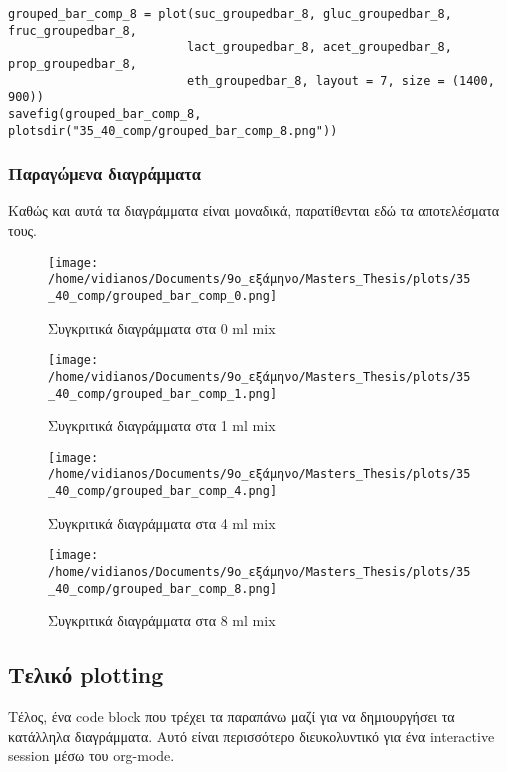 \documentclass[11pt]{article}
\begin{document}
\begin{verbatim}
grouped_bar_comp_8 = plot(suc_groupedbar_8, gluc_groupedbar_8, fruc_groupedbar_8,
                         lact_groupedbar_8, acet_groupedbar_8, prop_groupedbar_8,
                         eth_groupedbar_8, layout = 7, size = (1400, 900))
savefig(grouped_bar_comp_8, plotsdir("35_40_comp/grouped_bar_comp_8.png"))

\end{verbatim}

\subsubsection{Παραγώμενα διαγράμματα}
\label{sec:orgd11bb2e}
Καθώς και αυτά τα διαγράμματα είναι μοναδικά, παρατίθενται εδώ τα αποτελέσματα τους.

\begin{figure}[htbp]
\centering
\texttt{[image: /home/vidianos/Documents/9o\_εξάμηνο/Masters\_Thesis/plots/35\_40\_comp/grouped\_bar\_comp\_0.png]}
\caption{Συγκριτικά διαγράμματα στα 0 ml mix}
\end{figure}

\begin{figure}[htbp]
\centering
\texttt{[image: /home/vidianos/Documents/9o\_εξάμηνο/Masters\_Thesis/plots/35\_40\_comp/grouped\_bar\_comp\_1.png]}
\caption{Συγκριτικά διαγράμματα στα 1 ml mix}
\end{figure}

\begin{figure}[htbp]
\centering
\texttt{[image: /home/vidianos/Documents/9o\_εξάμηνο/Masters\_Thesis/plots/35\_40\_comp/grouped\_bar\_comp\_4.png]}
\caption{Συγκριτικά διαγράμματα στα 4 ml mix}
\end{figure}

\begin{figure}[htbp]
\centering
\texttt{[image: /home/vidianos/Documents/9o\_εξάμηνο/Masters\_Thesis/plots/35\_40\_comp/grouped\_bar\_comp\_8.png]}
\caption{Συγκριτικά διαγράμματα στα 8 ml mix}
\end{figure}

\pagebreak
\subsection{Τελικό plotting}
\label{sec:org1d42c6b}
Τέλος, ένα code block που τρέχει τα παραπάνω μαζί για να δημιουργήσει τα κατάλληλα διαγράμματα. Αυτό είναι περισσότερο διευκολυντικό για ένα interactive session μέσω του org-mode.
\end{document}

